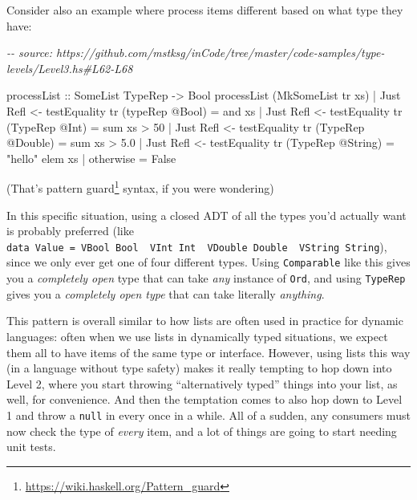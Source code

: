 \documentclass[]{article}
\newenvironment{Shaded}{}{}
\newcommand{\CommentTok}[1]{\textcolor[rgb]{0.38,0.63,0.69}{\textit{#1}}}
\newcommand{\DataTypeTok}[1]{\textcolor[rgb]{0.56,0.13,0.00}{#1}}
\newcommand{\DecValTok}[1]{\textcolor[rgb]{0.25,0.63,0.44}{#1}}
\newcommand{\FloatTok}[1]{\textcolor[rgb]{0.25,0.63,0.44}{#1}}
\newcommand{\FunctionTok}[1]{\textcolor[rgb]{0.02,0.16,0.49}{#1}}
\newcommand{\NormalTok}[1]{#1}
\newcommand{\OperatorTok}[1]{\textcolor[rgb]{0.40,0.40,0.40}{#1}}
\newcommand{\OtherTok}[1]{\textcolor[rgb]{0.00,0.44,0.13}{#1}}
\newcommand{\StringTok}[1]{\textcolor[rgb]{0.25,0.44,0.63}{#1}}
\renewcommand{\href}[2]{#2\footnote{\url{#1}}}
\begin{document}
Consider also an example where process items different based on what type they
have:

\begin{Shaded}
\begin{Highlighting}[]
\CommentTok{{-}{-} source: https://github.com/mstksg/inCode/tree/master/code{-}samples/type{-}levels/Level3.hs\#L62{-}L68}

\OtherTok{processList ::} \DataTypeTok{SomeList} \DataTypeTok{TypeRep} \OtherTok{{-}\textgreater{}} \DataTypeTok{Bool}
\NormalTok{processList (}\DataTypeTok{MkSomeList}\NormalTok{ tr xs)}
  \OperatorTok{|} \DataTypeTok{Just} \DataTypeTok{Refl} \OtherTok{\textless{}{-}}\NormalTok{ testEquality tr (typeRep }\OperatorTok{@}\DataTypeTok{Bool}\NormalTok{) }\OtherTok{=} \FunctionTok{and}\NormalTok{ xs}
  \OperatorTok{|} \DataTypeTok{Just} \DataTypeTok{Refl} \OtherTok{\textless{}{-}}\NormalTok{ testEquality tr (}\DataTypeTok{TypeRep} \OperatorTok{@}\DataTypeTok{Int}\NormalTok{) }\OtherTok{=} \FunctionTok{sum}\NormalTok{ xs }\OperatorTok{\textgreater{}} \DecValTok{50}
  \OperatorTok{|} \DataTypeTok{Just} \DataTypeTok{Refl} \OtherTok{\textless{}{-}}\NormalTok{ testEquality tr (}\DataTypeTok{TypeRep} \OperatorTok{@}\DataTypeTok{Double}\NormalTok{) }\OtherTok{=} \FunctionTok{sum}\NormalTok{ xs }\OperatorTok{\textgreater{}} \FloatTok{5.0}
  \OperatorTok{|} \DataTypeTok{Just} \DataTypeTok{Refl} \OtherTok{\textless{}{-}}\NormalTok{ testEquality tr (}\DataTypeTok{TypeRep} \OperatorTok{@}\DataTypeTok{String}\NormalTok{) }\OtherTok{=} \StringTok{"hello"} \OtherTok{\textasciigrave{}elem\textasciigrave{}}\NormalTok{ xs}
  \OperatorTok{|} \FunctionTok{otherwise} \OtherTok{=} \DataTypeTok{False}
\end{Highlighting}
\end{Shaded}

(That's \href{https://wiki.haskell.org/Pattern_guard}{pattern guard} syntax, if
you were wondering)

In this specific situation, using a closed ADT of all the types you'd actually
want is probably preferred (like
\texttt{data\ Value\ =\ VBool\ Bool\ \textbar{}\ VInt\ Int\ \textbar{}\ VDouble\ Double\ \textbar{}\ VString\ String}),
since we only ever get one of four different types. Using \texttt{Comparable}
like this gives you a \emph{completely open} type that can take \emph{any}
instance of \texttt{Ord}, and using \texttt{TypeRep} gives you a
\emph{completely open type} that can take literally \emph{anything}.

This pattern is overall similar to how lists are often used in practice for
dynamic languages: often when we use lists in dynamically typed situations, we
expect them all to have items of the same type or interface. However, using
lists this way (in a language without type safety) makes it really tempting to
hop down into Level 2, where you start throwing ``alternatively typed'' things
into your list, as well, for convenience. And then the temptation comes to also
hop down to Level 1 and throw a \texttt{null} in every once in a while. All of a
sudden, any consumers must now check the type of \emph{every} item, and a lot of
things are going to start needing unit tests.
\end{document}
